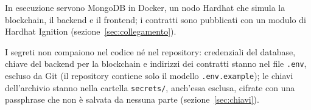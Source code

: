 In esecuzione servono MongoDB in Docker, un nodo Hardhat che simula la blockchain, il backend e il frontend; i contratti sono pubblicati con un modulo di Hardhat Ignition (sezione~\ref{sec:collegamento}).

I segreti non compaiono nel codice né nel repository: credenziali del database, chiave del backend per la blockchain e indirizzi dei contratti stanno nel file \texttt{.env}, escluso da Git (il repository contiene solo il modello \texttt{.env.example}); le chiavi dell'archivio stanno nella cartella \texttt{secrets/}, anch'essa esclusa, cifrate con una passphrase che non è salvata da nessuna parte (sezione~\ref{sec:chiavi}).
